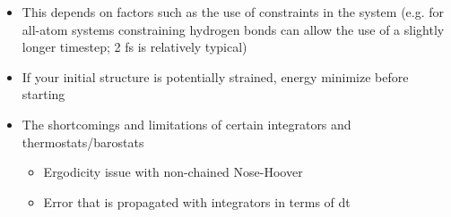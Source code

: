 \documentclass[9pt,bestpractices]{livecoms}
\begin{document}
\begin{itemize}
\begin{itemize}
\item This depends on factors such as the use of constraints in the system (e.g. for all-atom systems constraining hydrogen bonds can allow the use of a slightly longer timestep; 2 fs is relatively typical)
\item If your initial structure is potentially strained, energy minimize before starting
\item The shortcomings and limitations of certain integrators and thermostats/barostats
\begin{itemize}
\item Ergodicity issue with non-chained Nose-Hoover
\item Error that is propagated with integrators in terms of dt
\end{itemize}
\end{itemize}
\end{itemize}






\nocite{*}
{}
\end{document}
